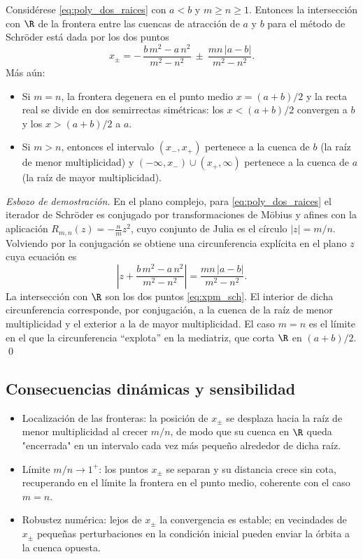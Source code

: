 \begin{teorema}
\label{teo:frontera_real_sch}
Considérese \eqref{eq:poly_dos_raices} con $a<b$ y $m\ge n\ge 1$. Entonces la intersección con $\R$ de la frontera entre las cuencas de atracción de $a$ y $b$ para el método de Schr\"oder está dada por los dos puntos
\begin{equation}
 x_{\pm}= -\,\frac{b\,m^2-a\,n^2}{m^2-n^2}\ \pm\ \frac{mn\,|a-b|}{m^2-n^2}.
 \label{eq:xpm_sch}
\end{equation}
Más aún:
\begin{itemize}
\item Si $m=n$, la frontera degenera en el punto medio $x=(a+b)/2$ y la recta real se divide en dos semirrectas simétricas: los $x<(a+b)/2$ convergen a $b$ y los $x>(a+b)/2$ a $a$.
\item Si $m>n$, entonces el intervalo $(x_{-},x_{+})$ pertenece a la cuenca de $b$ (la raíz de menor multiplicidad) y $(-\infty,x_{-})\cup(x_{+},\infty)$ pertenece a la cuenca de $a$ (la raíz de mayor multiplicidad).
\end{itemize}
\end{teorema}

\noindent
\textit{Esbozo de demostración.} En el plano complejo, para \eqref{eq:poly_dos_raices} el iterador de Schr\"oder es conjugado por transformaciones de M\"obius y afines con la aplicación $R_{m,n}(z)=-\tfrac{n}{m}z^2$, cuyo conjunto de Julia es el círculo $|z|=m/n$. Volviendo por la conjugación se obtiene una circunferencia explícita en el plano $z$ cuya ecuación es
\[
 \left|z+\frac{b\,m^2-a\,n^2}{m^2-n^2}\right|=\frac{mn\,|a-b|}{m^2-n^2}.
\]
La intersección con $\R$ son los dos puntos \eqref{eq:xpm_sch}. El interior de dicha circunferencia corresponde, por conjugación, a la cuenca de la raíz de menor multiplicidad y el exterior a la de mayor multiplicidad. El caso $m=n$ es el límite en el que la circunferencia “explota” en la mediatriz, que corta $\R$ en $(a+b)/2$. \qed

\subsection{Consecuencias dinámicas y sensibilidad}

\begin{itemize}
\item Localización de las fronteras: la posición de $x_{\pm}$ se desplaza hacia la raíz de menor multiplicidad al crecer $m/n$, de modo que su cuenca en $\R$ queda "encerrada" en un intervalo cada vez más pequeño alrededor de dicha raíz.
\item Límite $m/n\to 1^+$: los puntos $x_{\pm}$ se separan y su distancia crece sin cota, recuperando en el límite la frontera en el punto medio, coherente con el caso $m=n$.
\item Robustez numérica: lejos de $x_{\pm}$ la convergencia es estable; en vecindades de $x_{\pm}$ pequeñas perturbaciones en la condición inicial pueden enviar la órbita a la cuenca opuesta.
\end{itemize}

